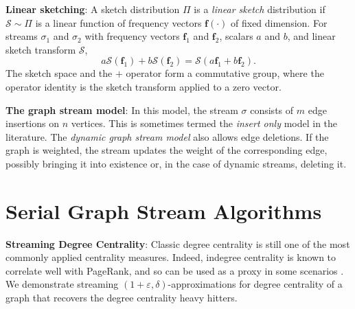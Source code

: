 \documentclass[10]{report}
\begin{document}
\noindent
\textbf{Linear sketching}:
A sketch distribution $\Pi$ is a \emph{linear sketch} distribution if $\mathcal{S} \sim \Pi$ is a linear function of frequency vectors $\mathbf{f}(\cdot)$ of fixed dimension.
%
For streams $\sigma_1$ and $\sigma_2$ with frequency vectors $\mathbf{f}_1$ and $\mathbf{f}_2$, scalars $a$ and $b$, and linear sketch transform $\mathcal{S}$, 
%
\begin{equation} \label{eq:linearity}
a\mathcal{S}(\mathbf{f}_1) + b\mathcal{S}(\mathbf{f}_2) = \mathcal{S}(a\mathbf{f}_1 + b\mathbf{f}_2).
\end{equation}
%
The sketch space and the $+$ operator form a commutative group, where the operator identity is the sketch transform applied to a zero vector.

\noindent
\textbf{The graph stream model}:
In this model, the stream $\sigma$ consists of $m$ edge insertions on $n$ vertices. 
This is sometimes termed the \emph{insert only} model in the literature.
The \emph{dynamic graph stream model} also allows edge deletions.
If the graph is weighted, the stream updates the weight of the corresponding edge, possibly bringing it into existence or, in the case of dynamic streams, deleting it.


\section{Serial Graph Stream Algorithms} \label{intro:sec:serial_streaming}

\textbf{Streaming Degree Centrality}:
Classic degree centrality is still one of the most commonly applied centrality measures.
%
Indeed, indegree centrality is known to correlate well with PageRank, and so can be used as a proxy in some scenarios \cite{upstill2003predicting}.
We demonstrate streaming $(1+\varepsilon, \delta)$-approximations for degree centrality of a graph that recovers the degree centrality heavy hitters.
\end{document}
